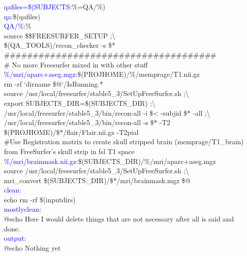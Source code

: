\documentclass[oneside,11pt]{memoir}
\newcommand{\maker}[2]{\textcolor{blue}{#1}:\enspace#2}
\newcommand{\tab}{\hspace*{4em}}
\begin{document}
\maker{qafiles=\$(SUBJECTS}{\%=QA/\%)} \\
	
\maker{qa}{\$(qafiles)} \\
	
\maker{QA/\%}{\%} \\
\tab source \$\$FREESURFER_SETUP  ;\textbackslash \\
\tab \$(QA_TOOLS)/recon_checker -s \$* \\
	
\#\#\#\#\#\#\#\#\#\#\#\#\#\#\#\#\#\#\#\#\#\#\#\#\#\#\#\#\#\#\#\#\#\#\#\#\# \\
	
\# No more Freesurfer mixed in with other stuff \\
	
\maker{\%/mri/aparc+aseg.mgz}{\$(PROJHOME)/\%/memprage/T1.nii.gz} \\
\tab rm -rf `dirname \$@`/IsRunning.* \\
\tab source /usr/local/freesurfer/stable5_3/SetUpFreeSurfer.sh  ;\textbackslash \\
\tab export SUBJECTS_DIR=\$(SUBJECTS_DIR)  ;\textbackslash \\
\tab /usr/local/freesurfer/stable5_3/bin/recon-all -i \$< -subjid \$* -all  ;\textbackslash \\
\tab /usr/local/freesurfer/stable5_3/bin/recon-all -s \$* -T2 \$(PROJHOME)/\$*/flair/Flair.nii.gz -T2pial \\
	
\#Use Registration matrix to create skull stripped brain (memprage/T1_brain) from FreeSurfer's skull strip in fsl T1 space \\
	
\maker{\%/mri/brainmask.nii.gz}{\$(SUBJECTS_DIR)/\%/mri/aparc+aseg.mgz} \\
\tab source /usr/local/freesurfer/stable5_3/SetUpFreeSurfer.sh  ;\textbackslash \\
\tab mri_convert \$(SUBJECTS_DIR)/\$*/mri/brainmask.mgz \$@ \\

\maker{clean}{} \\
\tab echo rm -rf \$(inputdirs) \\
	
\maker{mostlyclean}{} \\
\tab @echo Here I would delete things that are not necessary after all is said and done. \\
	
\maker{output}{} \\
\tab @echo Nothing yet \\
	
\end{document}
